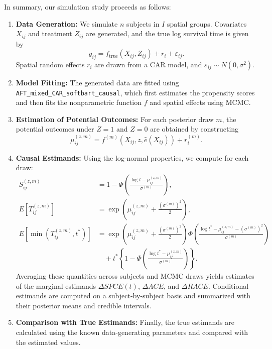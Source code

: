 \documentclass[useAMS,referee]{biom}
\begin{document}
In summary, our simulation study proceeds as follows:
\begin{enumerate}
    \item \textbf{Data Generation:}  
    We simulate \(n\) subjects in \(I\) spatial groups. Covariates \(X_{ij}\) and treatment \(Z_{ij}\) are generated, and the true log survival time is given by
    \[
    y_{ij} = f_{\text{true}}(X_{ij}, Z_{ij}) + r_i + \varepsilon_{ij}.
    \]
    Spatial random effects \(r_i\) are drawn from a CAR model, and \(\varepsilon_{ij}\sim N(0,\sigma^2)\).

    \item \textbf{Model Fitting:}  
    The generated data are fitted using \texttt{AFT\_mixed\_CAR\_softbart\_causal}, which first estimates the propensity scores and then fits the nonparametric function \(f\) and spatial effects using MCMC.

    \item \textbf{Estimation of Potential Outcomes:}  
    For each posterior draw \(m\), the potential outcomes under \(Z=1\) and \(Z=0\) are obtained by constructing
    \[
    \mu_{ij}^{(z,m)} = f^{(m)}(X_{ij}, z, \hat{e}(X_{ij})) + r_i^{(m)}.
    \]
    
    \item \textbf{Causal Estimands:}  
    Using the log-normal properties, we compute for each draw:
    \begin{align*}
    S_{ij}^{(z,m)} &= 1 - \Phi\left(\frac{\log t - \mu_{ij}^{(z,m)}}{\sigma^{(m)}}\right), \\
    E[T_{ij}^{(z,m)}] &= \exp\left(\mu_{ij}^{(z,m)} + \frac{(\sigma^{(m)})^2}{2}\right), \\
    E\left[\min\left(T_{ij}^{(z,m)}, t^*\right)\right] &= \exp\left(\mu_{ij}^{(z,m)} + \frac{(\sigma^{(m)})^2}{2}\right)\Phi\left(\frac{\log t^* - \mu_{ij}^{(z,m)} - (\sigma^{(m)})^2}{\sigma^{(m)}}\right) \\
    &\quad + t^*\left\{1 - \Phi\left(\frac{\log t^* - \mu_{ij}^{(z,m)}}{\sigma^{(m)}}\right)\right\}.
    \end{align*}
    Averaging these quantities across subjects and MCMC draws yields estimates of the marginal estimands \(\Delta SPCE(t)\), \(\Delta ACE\), and \(\Delta RACE\). Conditional estimands are computed on a subject-by-subject basis and summarized with their posterior means and credible intervals.

    \item \textbf{Comparison with True Estimands:}  
    Finally, the true estimands are calculated using the known data-generating parameters and compared with the estimated values.
\end{enumerate}
\end{document}
